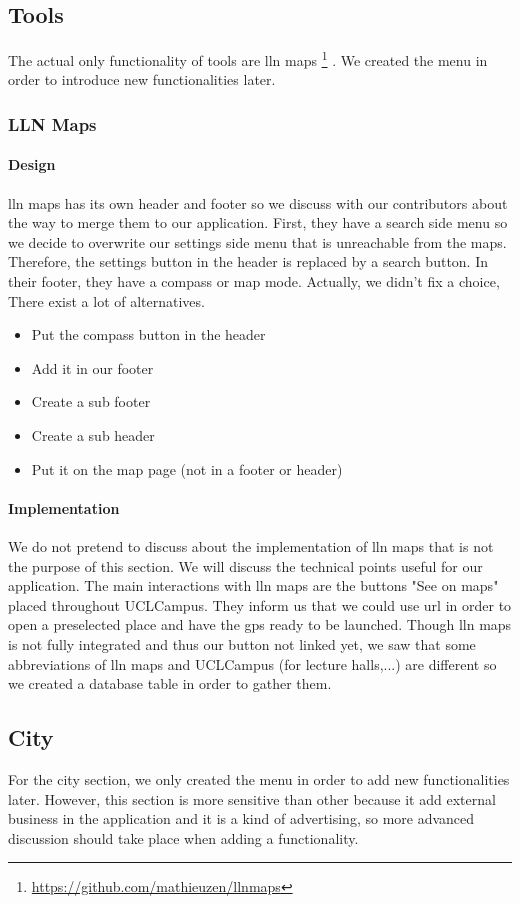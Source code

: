 \documentclass[11pt, a4paper]{report}
\begin{document}
\subsection{Tools}
The actual only functionality of tools are lln maps \footnote{\url{https://github.com/mathieuzen/llnmaps}} . We created the menu in order to introduce new functionalities later. 
\subsubsection{LLN Maps}
\paragraph{Design}
lln maps has its own header and footer so we discuss with our contributors about the way to merge them to our application. First, they have a search side menu so we decide to overwrite our settings side menu that is unreachable from the maps. Therefore, the settings button in the header is replaced by a search button. In their footer, they have a compass or map mode. Actually, we didn't fix a choice, There exist a lot of alternatives.
\begin{itemize}
\item Put the compass button in the header
\item Add it in our footer
\item Create a sub footer
\item Create a sub header
\item Put it on the map page (not in a footer or header) 
\end{itemize}
\paragraph{Implementation}
We do not pretend to discuss about the implementation of lln maps that is not the purpose of this section. We will discuss the technical points useful for our application. The main interactions with lln maps are the buttons "See on maps" placed throughout UCLCampus. They inform us that we could use url in order to open a preselected place and have the gps ready to be launched. Though lln maps is not fully integrated and thus our button not linked yet, we saw that some abbreviations of lln maps and UCLCampus (for lecture halls,...) are different so we created a database table in order to gather them. 
\subsection{City}
For the city section, we only created the menu in order to add new functionalities later. However, this section is more sensitive than other because it add external business in the application and it is a kind of advertising, so more advanced discussion should take place when adding a functionality.
\end{document}
